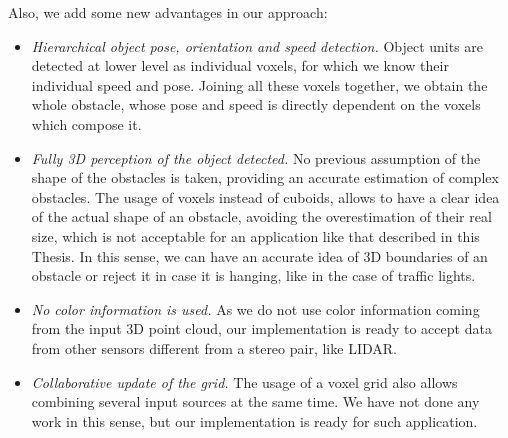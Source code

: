 Also, we add some new advantages in our approach:
\begin{itemize}
 \item \emph{Hierarchical object pose, orientation and speed detection.} Object units are detected at lower level as individual voxels, for which we know their individual speed and pose. Joining all these voxels together, we obtain the whole obstacle, whose pose and speed is directly dependent on the voxels which compose it. 
 \item \emph{Fully 3D perception of the object detected.} No previous assumption of the shape of the obstacles is taken, providing an accurate estimation of complex obstacles. The usage of voxels instead of cuboids, allows to have a clear idea of the actual shape of an obstacle, avoiding the overestimation of their real size, which is not acceptable for an application like that described in this Thesis. In this sense, we can have an accurate idea of 3D boundaries of an obstacle or reject it in case it is hanging, like in the case of traffic lights.
 \item \emph{No color information is used.} As we do not use color information coming from the input 3D point cloud, our implementation is ready to accept data from other sensors different from a stereo pair, like \ac{LIDAR}.
 \item \emph{Collaborative update of the grid.} The usage of a voxel grid also allows combining several input sources at the same time. We have not done any work in this sense, but our implementation is ready for such application.
\end{itemize}

